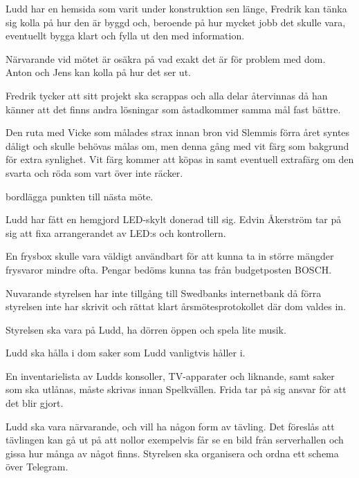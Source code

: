 \documentclass{protokoll}
\begin{document}
Ludd har en hemsida som varit under konstruktion sen länge, Fredrik kan tänka sig kolla på hur den är byggd och, beroende på hur mycket jobb det skulle vara, eventuellt bygga klart och fylla ut den med information.

Närvarande vid mötet är osäkra på vad exakt det är för problem med dom. 
Anton och Jens kan kolla på hur det ser ut. 


Fredrik tycker att sitt projekt ska scrappas och alla delar återvinnas då han känner att det finns andra lösningar som åstadkommer samma mål fast bättre.

Den ruta med Vicke som målades strax innan bron vid Slemmis förra året syntes dåligt och skulle behövas målas om, men denna gång med vit färg som bakgrund för extra synlighet. 
Vit färg kommer att köpas in samt eventuell extrafärg om den svarta och röda som vart över inte räcker. 

\begin{beslut}
    \att bordlägga punkten till nästa möte.
\end{beslut}

Ludd har fått en hemgjord LED-skylt donerad till sig.  
Edvin Åkerström tar på sig att fixa arrangerandet av LED:s och kontrollern.

En frysbox skulle vara väldigt användbart för att kunna ta in större mängder frysvaror mindre ofta. Pengar bedöms kunna tas från budgetposten BOSCH. 

Nuvarande styrelsen har inte tillgång till Swedbanks internetbank då förra styrelsen inte har skrivit och rättat klart årsmötesprotokollet där dom valdes in.

Styrelsen ska vara på Ludd, ha dörren öppen och spela lite musik.

Ludd ska hålla i dom saker som Ludd vanligtvis håller i.

En inventarielista av Ludds konsoller, TV-apparater och liknande, samt saker som ska utlånas, måste skrivas innan Spelkvällen. 
Frida tar på sig ansvar för att det blir gjort. 

Ludd ska vara närvarande, och vill ha någon form av tävling. Det föreslås att tävlingen kan gå ut på att nollor exempelvis får se en bild från serverhallen och gissa hur många av något finns. 
Styrelsen ska organisera och ordna ett schema över Telegram. 
\end{document}
